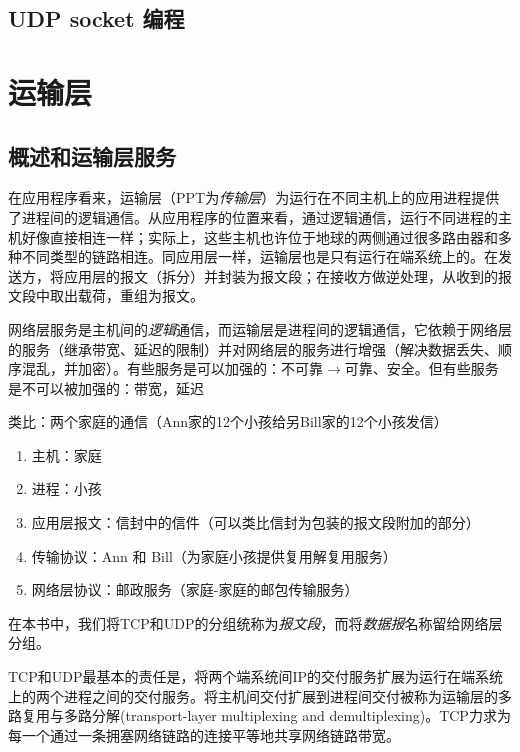 \documentclass[]{report}
\begin{document}
	\section{UDP socket 编程}

	\chapter{运输层}
	\section{概述和运输层服务}
		在应用程序看来，运输层（PPT为\textit{传输层}）为运行在不同主机上的应用进程提供了进程间的逻辑通信。从应用程序的位置来看，通过逻辑通信，运行不同进程的主机好像直接相连一样；实际上，这些主机也许位于地球的两侧通过很多路由器和多种不同类型的链路相连。同应用层一样，运输层也是只有运行在端系统上的。在发送方，将应用层的报文（拆分）并封装为报文段；在接收方做逆处理，从收到的报文段中取出载荷，重组为报文。\par
		网络层服务是主机间的\textit{逻辑}通信，而运输层是进程间的逻辑通信，它依赖于网络层的服务（继承带宽、延迟的限制）并对网络层的服务进行增强（解决数据丢失、顺序混乱，并加密）。有些服务是可以加强的：不可靠$\to$可靠、安全。但有些服务是不可以被加强的：带宽，延迟\par
		类比：两个家庭的通信（Ann家的12个小孩给另Bill家的12个小孩发信）
		\begin{enumerate}
			\item 主机：家庭
			\item 进程：小孩
			\item 应用层报文：信封中的信件（可以类比信封为包装的报文段附加的部分）
			\item 传输协议：Ann 和 Bill（为家庭小孩提供复用解复用服务）
			\item 网络层协议：邮政服务（家庭-家庭的邮包传输服务）
		\end{enumerate}
		在本书中，我们将TCP和UDP的分组统称为\textit{报文段}，而将\textit{数据报}名称留给网络层分组。\par
		TCP和UDP最基本的责任是，将两个端系统间IP的交付服务扩展为运行在端系统上的两个进程之间的交付服务。将主机间交付扩展到进程间交付被称为运输层的多路复用与多路分解(transport-layer multiplexing and demultiplexing)。TCP力求为每一个通过一条拥塞网络链路的连接平等地共享网络链路带宽。
\end{document}
